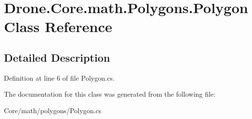 \hypertarget{class_drone_1_1_core_1_1math_1_1_polygons_1_1_polygon}{}\section{Drone.\+Core.\+math.\+Polygons.\+Polygon Class Reference}
\label{class_drone_1_1_core_1_1math_1_1_polygons_1_1_polygon}


\subsection{Detailed Description}


Definition at line 6 of file Polygon.\+cs.



The documentation for this class was generated from the following file\+:\begin{DoxyCompactItemize}
\item 
Core/math/polygons/Polygon.\+cs\end{DoxyCompactItemize}
